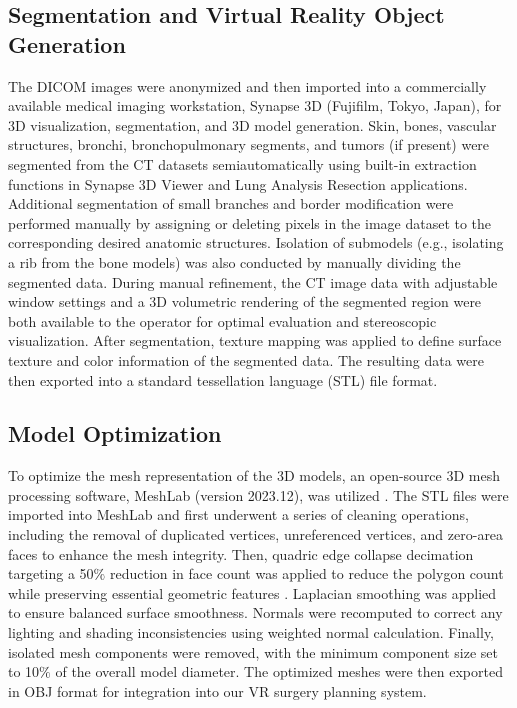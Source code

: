 \documentclass{bmcart}
\begin{document}
\subsection{Segmentation and Virtual Reality Object Generation}
The DICOM images were anonymized and then imported into a commercially available medical imaging workstation, Synapse 3D (Fujifilm, Tokyo, Japan), for 3D visualization, segmentation, and 3D model generation. Skin, bones, vascular structures, bronchi, bronchopulmonary segments, and tumors (if present) were segmented from the CT datasets semiautomatically using built-in extraction functions in Synapse 3D Viewer and Lung Analysis Resection applications. Additional segmentation of small branches and border modification were performed manually by assigning or deleting pixels in the image dataset to the corresponding desired anatomic structures. Isolation of submodels (e.g., isolating a rib from the bone models) was also conducted by manually dividing the segmented data. During manual refinement, the CT image data with adjustable window settings and a 3D volumetric rendering of the segmented region were both available to the operator for optimal evaluation and stereoscopic visualization. After segmentation, texture mapping was applied to define surface texture and color information of the segmented data. The resulting data were then exported into a standard tessellation language (STL) file format.
\subsection{Model Optimization}
To optimize the mesh representation of the 3D models, an open-source 3D mesh processing software, MeshLab (version 2023.12), was utilized \cite{RN19}. The STL files were imported into MeshLab and first underwent a series of cleaning operations, including the removal of duplicated vertices, unreferenced vertices, and zero-area faces to enhance the mesh integrity. Then, quadric edge collapse decimation targeting a 50$\%$ reduction in face count was applied to reduce the polygon count while preserving essential geometric features \cite{RN20}. Laplacian smoothing was applied to ensure balanced surface smoothness. Normals were recomputed to correct any lighting and shading inconsistencies using weighted normal calculation. Finally, isolated mesh components were removed, with the minimum component size set to 10$\%$ of the overall model diameter. The optimized meshes were then exported in OBJ format for integration into our VR surgery planning system.
\end{document}
